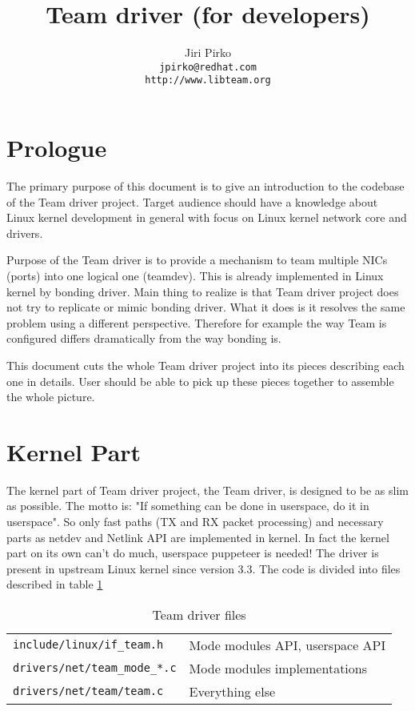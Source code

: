 \documentclass[11pt,a4paper]{article}
\begin{document}
\title{Team driver (for developers)}
\author{Jiri Pirko\\
\texttt{jpirko@redhat.com}\\
\texttt{http://www.libteam.org}}

\maketitle
\newpage

\section{Prologue}
The primary purpose of this document is to give an introduction to the codebase of the Team driver project. Target audience should have a knowledge about Linux kernel development in general with focus on Linux kernel network core and drivers.

Purpose of the Team driver is to provide a mechanism to team multiple NICs (ports) into one logical one (teamdev). This is already implemented in Linux kernel by bonding driver. Main thing to realize is that Team driver project does not try to replicate or mimic bonding driver. What it does is it resolves the same problem using a different perspective. Therefore for example the way Team is configured differs dramatically from the way bonding is.

This document cuts the whole Team driver project into its pieces describing each one in details. User should be able to pick up these pieces together to assemble the whole picture.

\section{Kernel Part}

The kernel part of Team driver project, the Team driver, is designed to be as slim as possible. The motto is: "If something can be done in userspace, do it in userspace". So only fast paths (TX and RX packet processing) and necessary parts as netdev and Netlink API are implemented in kernel. In fact the kernel part on its own can't do much, userspace puppeteer is needed! The driver is present in upstream Linux kernel since version 3.3. The code is divided into files described in table \ref{table1}

\begin{table}[ht]
  \begin{tabular}{ l l }
    \verb+include/linux/if_team.h+ & Mode modules API, userspace API  \\
    \verb+drivers/net/team_mode_*.c+ & Mode modules implementations \\
    \verb+drivers/net/team/team.c+ & Everything else \\
  \end{tabular}
  \caption{Team driver files}
  \label{table1}
\end{table}
\end{document}

